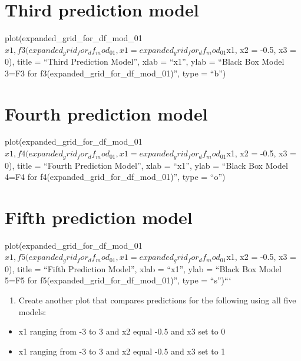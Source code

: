 \documentclass[
  letterpaper,
  DIV=11,
  numbers=noendperiod]{scrreprt}
\providecommand{\tightlist}{%
  \setlength{\itemsep}{0pt}\setlength{\parskip}{0pt}}
\begin{document}

\chapter{Third prediction model}\label{third-prediction-model}

plot(expanded\_grid\_for\_df\_mod\_01\(x1, f3(expanded_grid_for_df_mod_01, x1 = expanded_grid_for_df_mod_01\)x1,
x2 = -0.5, x3 = 0), title = ``Third Prediction Model'', xlab = ``x1'',
ylab = ``Black Box Model 3=F3 for
f3(expanded\_grid\_for\_df\_mod\_01)'', type = ``b'')


\chapter{Fourth prediction model}\label{fourth-prediction-model}

plot(expanded\_grid\_for\_df\_mod\_01\(x1, f4(expanded_grid_for_df_mod_01, x1 = expanded_grid_for_df_mod_01\)x1,
x2 = -0.5, x3 = 0), title = ``Fourth Prediction Model'', xlab = ``x1'',
ylab = ``Black Box Model 4=F4 for
f4(expanded\_grid\_for\_df\_mod\_01)'', type = ``o'')


\chapter{Fifth prediction model}\label{fifth-prediction-model}

plot(expanded\_grid\_for\_df\_mod\_01\(x1, f5(expanded_grid_for_df_mod_01, x1 = expanded_grid_for_df_mod_01\)x1,
x2 = -0.5, x3 = 0), title = ``Fifth Prediction Model'', xlab = ``x1'',
ylab = ``Black Box Model 5=F5 for
f5(expanded\_grid\_for\_df\_mod\_01)'', type = ``s'')```

\begin{enumerate}
\def\labelenumi{\arabic{enumi}.}
\setcounter{enumi}{2}
\tightlist
\item
  Create another plot that compares predictions for the following using
  all five models:
\end{enumerate}

\begin{itemize}
\tightlist
\item
  x1 ranging from -3 to 3 and x2 equal -0.5 and x3 set to 0
\item
  x1 ranging from -3 to 3 and x2 equal -0.5 and x3 set to 1
\end{itemize}
\end{document}
